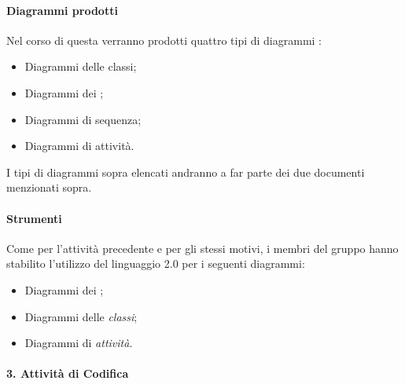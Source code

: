                         \paragraph*{Diagrammi prodotti}
                        Nel corso di questa  verranno prodotti quattro tipi di diagrammi :
                        \begin{itemize}
                        \item Diagrammi delle classi;
                        \item Diagrammi dei ;
                        \item Diagrammi di sequenza;
                        \item Diagrammi di attivit\`a.
                        \end{itemize}
                        I tipi di diagrammi sopra elencati andranno a far parte dei due documenti menzionati sopra.
		
		 
		        \paragraph*{Strumenti}
		        Come per l'attivit\`a precedente e per gli stessi motivi, i membri del gruppo hanno stabilito l'utilizzo del linguaggio  2.0 per i seguenti
		        diagrammi:
		        \begin{itemize}
			\item Diagrammi dei ; 
			\item Diagrammi delle \textit{classi};	
			\item Diagrammi di \textit{attivit\`a}.
		        \end{itemize}
			 
		
		\paragraph*{3. Attività di Codifica}
